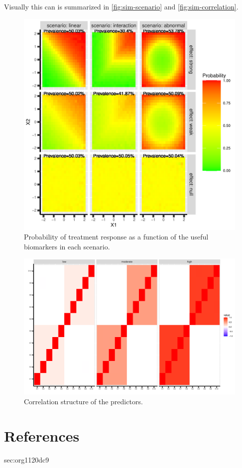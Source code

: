 \documentclass[12pt]{article}
\begin{document}
Visually this can is summarized in \autoref{fig:sim-scenario} and  \autoref{fig:sim-correlation}.
\begin{figure}[htbp]
\centering
\includegraphics[width=1\textwidth]{./Figures/fig-scenario.pdf}
\caption{\label{fig:sim-scenario}Probability of treatment response as a function of the useful biomarkers in each scenario.}
\end{figure}

\begin{figure}[htbp]
\centering
\includegraphics[width=1\textwidth]{./Figures/fig-correlation.pdf}
\caption{\label{fig:sim-correlation}Correlation structure of the predictors.}
\end{figure}


\section{References}
\label{sec:orgfb22c1d}
\begingroup
\renewcommand{\section}[2]{}



\endgroup

\section{Setting}
\label{sec:org1120dc9}
\end{document}
